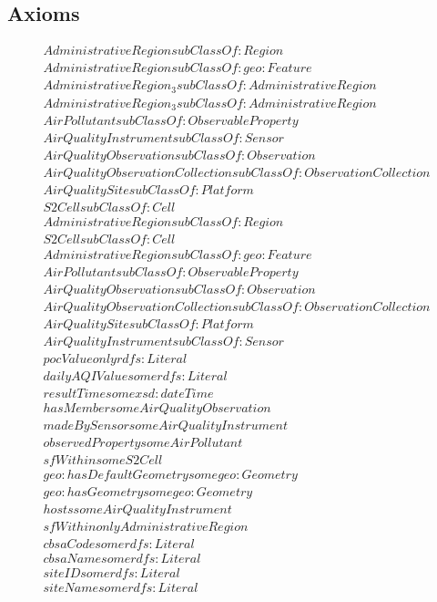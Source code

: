 \subsection{Axioms}
\begin{align}
  AdministrativeRegion subClassOf: Region\\
  AdministrativeRegion subClassOf: geo:Feature\\
  AdministrativeRegion_3 subClassOf: AdministrativeRegion\\
  AdministrativeRegion_3 subClassOf: AdministrativeRegion\\
  AirPollutant subClassOf: ObservableProperty\\
  AirQualityInstrument subClassOf: Sensor\\
  AirQualityObservation subClassOf: Observation\\
  AirQualityObservationCollection subClassOf: ObservationCollection\\
  AirQualitySite subClassOf: Platform\\
  S2Cell subClassOf: Cell\\
  AdministrativeRegion subClassOf: Region\\
  S2Cell subClassOf: Cell\\
  AdministrativeRegion subClassOf: geo:Feature\\
  AirPollutant subClassOf: ObservableProperty\\
  AirQualityObservation subClassOf: Observation\\
  AirQualityObservationCollection subClassOf: ObservationCollection\\
  AirQualitySite subClassOf: Platform\\
  AirQualityInstrument subClassOf: Sensor\\
  pocValue only rdfs:Literal \\
  dailyAQIValue some rdfs:Literal \\
  resultTime some xsd:dateTime \\
  hasMember some AirQualityObservation \\
  madeBySensor some AirQualityInstrument \\
  observedProperty some AirPollutant \\
  sfWithin some S2Cell \\
  geo:hasDefaultGeometry some geo:Geometry \\
  geo:hasGeometry some geo:Geometry \\
  hosts some AirQualityInstrument \\
  sfWithin only AdministrativeRegion \\
  cbsaCode some rdfs:Literal \\
  cbsaName some rdfs:Literal \\
  siteID some rdfs:Literal \\
  siteName some rdfs:Literal \end{align}


